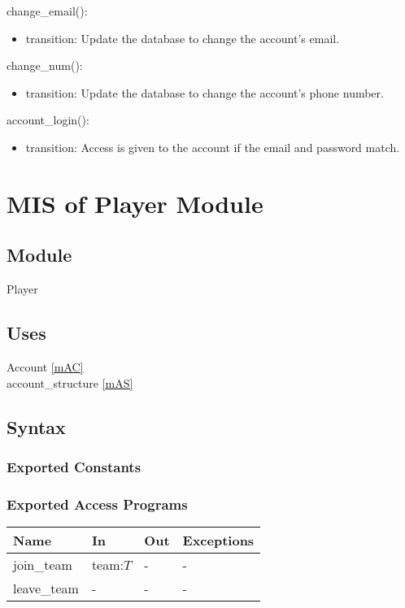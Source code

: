 \documentclass[12pt, titlepage]{article}
\begin{document}
\noindent change\_email():
\begin{itemize}
\item transition: Update the database to change the account's email.
\end{itemize}

\noindent change\_num():
\begin{itemize}
\item transition: Update the database to change the account's phone number.
\end{itemize}

\noindent account\_login():
\begin{itemize}
\item transition: Access is given to the account if the email and password match.
\end{itemize}

\newpage

\section{MIS of Player Module} \label{mPL}

\subsection{Module}

Player

\subsection{Uses}

Account \ref{mAC}\\
account\_structure \ref{mAS}

\subsection{Syntax}

\subsubsection{Exported Constants}

\subsubsection{Exported Access Programs}

\begin{center}
\begin{tabular}{p{2cm} p{4cm} p{4cm} p{2cm}}
\hline
\textbf{Name} & \textbf{In} & \textbf{Out} & \textbf{Exceptions} \\
\hline
join\_team & team:$T$ & - & - \\
leave\_team & - & - & - \\
\hline
\end{tabular}
\end{center}
\end{document}

